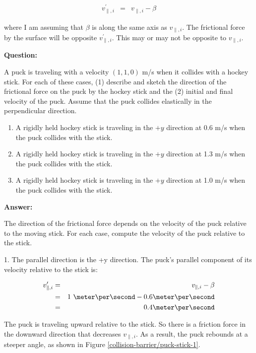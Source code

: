 \begin{eqnarray*}
	v^\prime_{\parallel,i} & = & v_{\parallel,i} - \beta
\end{eqnarray*}

where I am assuming that $\beta$ is along the same axis as  $v_{\parallel,i}$. The frictional force by the surface will be opposite $v^\prime_{\parallel,i}$. This may or may not be opposite to $v_{\parallel,i}$.


{\bf Question:}

A puck is traveling with a velocity $(1,1,0)$ m/s when it collides with a hockey stick. For each of these cases, (1) describe and sketch the direction of the frictional force on the puck by the hockey stick and the (2) initial and final velocity of the puck. Assume that the puck collides elastically in the perpendicular direction. 

\begin{enumerate}
	\item A rigidly held hockey stick is traveling in the $+y$ direction at 0.6 m/s when the puck collides with the stick.
	\item A rigidly held hockey stick is traveling in the $+y$ direction at 1.3 m/s when the puck collides with the stick.
	\item A rigidly held hockey stick is traveling in the $+y$ direction at 1.0 m/s when the puck collides with the stick.
\end{enumerate}

{\bf Answer:}

The direction of the frictional force depends on the velocity of the puck relative to the moving stick. For each case, compute the velocity of the puck relative to the stick.

1. The parallel direction is the +y direction. The puck's parallel component of its velocity relative to the stick is:

\begin{eqnarray*}
	v^\prime_{\parallel,i} & = & v_{\parallel,i} - \beta \\
	& = & 1\ \meter\per\second - 0.6 \meter\per\second \\
	& = & 0.4 \meter\per\second
\end{eqnarray*}

The puck is traveling upward relative to the stick. So there is a friction force in the downward direction that decreases $v_{\parallel,i}$. As a result, the puck rebounds at a steeper angle, as shown in Figure \ref{collision-barrier/puck-stick-1}.

